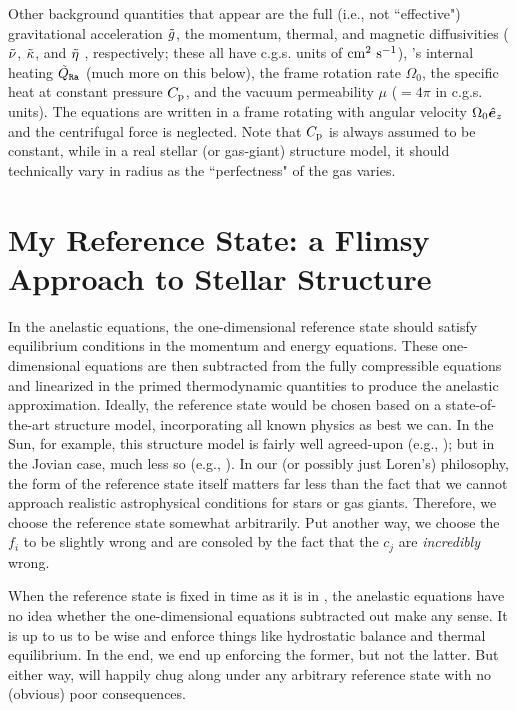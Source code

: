 \documentclass[12pt]{article}
\numberwithin{equation}{section}
\begin{document}
	Other background quantities that appear are the full (i.e., not ``effective") gravitational acceleration $\tilde{g}$, the momentum, thermal, and magnetic diffusivities ($\tilde{\nu}$, $\tilde{\kappa}$, and $\tilde{\eta}$ , respectively; these all have c.g.s. units of $\rm{cm^2\ s^{-1}}$), {\rayleigh}'s internal heating $\tilde{Q}_{\texttt{Ra}}$ (much more on this below), the frame rotation rate $\Omega_0$, the specific heat at constant pressure $C_{\rm{p}}$, and the vacuum permeability $\mu$ ($=4\pi$ in c.g.s. units). The equations are written in a frame rotating with angular velocity $\Omega_0\hat{\bm{e}}_z$ and the centrifugal force is neglected. Note that $C_{\rm{p}}$ is always assumed to be constant, while in a real stellar (or gas-giant) structure model, it should technically vary in radius as the ``perfectness" of the gas varies. 
	
	\section{My Reference State: a Flimsy Approach to Stellar Structure}\label{sec:ref}
	In the anelastic equations, the one-dimensional reference state should satisfy equilibrium conditions in the momentum and energy equations. These one-dimensional equations are then subtracted from the fully compressible equations and linearized in the primed thermodynamic quantities to produce the anelastic approximation. Ideally, the reference state would be chosen based on a state-of-the-art structure model, incorporating all known physics as best we can. In the Sun, for example, this structure model is fairly well agreed-upon (e.g., \citealt{ChristensenDalsgaard1996}); but in the Jovian case, much less so (e.g., \citealt{Guillot2005}). In our (or possibly just Loren's) philosophy, the form of the reference state itself matters far less than the fact that we cannot approach realistic astrophysical conditions for stars or gas giants. Therefore, we choose the reference state somewhat arbitrarily. Put another way, we choose the $f_i$ to be slightly wrong and are consoled by the fact that the $c_j$ are \textit{incredibly} wrong. 
	
	When the reference state is fixed in time as it is in {\rayleigh}, the anelastic equations have no idea whether the one-dimensional equations subtracted out make any sense. It is up to us to be wise and enforce things like hydrostatic balance and thermal equilibrium. In the end, we end up enforcing the former, but not the latter. But either way, {\rayleigh} will happily chug along under any arbitrary reference state with no (obvious) poor consequences. 
	
\end{document}
